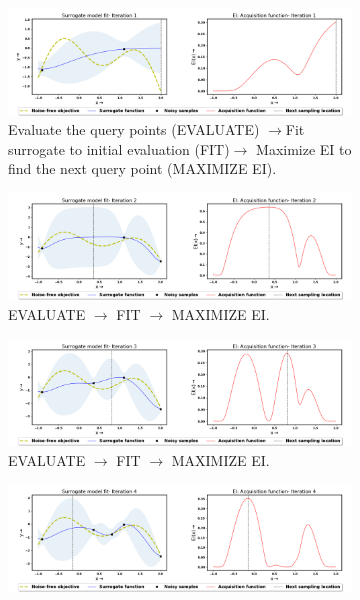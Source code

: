 \begin{figure}[!ht]
		\centering
		\begin{subfigure}{1\textwidth}
  			\centering
  			\includegraphics[width=1\linewidth, height=0.2\textheight]{images/BO1.png}
  			\caption{Evaluate the query points (EVALUATE) $\rightarrow$Fit surrogate to initial evaluation (FIT)$\rightarrow$ Maximize EI to find the next query point (MAXIMIZE EI).}
  			\label{fig:BO1}
		\end{subfigure}
		\begin{subfigure}{1\textwidth}
  			\centering
  			\includegraphics[width=1\linewidth, height=0.2\textheight]{images/BO2.png}
  			\caption{EVALUATE $\rightarrow$ FIT $\rightarrow$ MAXIMIZE EI.}
  			\label{fig:BO2}
		\end{subfigure}
		\begin{subfigure}{1\textwidth}
  			\centering
  			\includegraphics[width=1\linewidth, height=0.2\textheight]{images/BO3.png}
  			\caption{EVALUATE $\rightarrow$ FIT $\rightarrow$ MAXIMIZE EI.}
  			\label{fig:BO3}
		\end{subfigure}
		\begin{subfigure}{1\textwidth}
  			\centering
  			\includegraphics[width=1\linewidth, height=0.2\textheight]{images/BO4.png}

\end{subfigure}
\end{figure}
